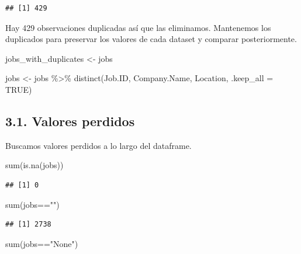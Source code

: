 \documentclass[
]{article}
\newenvironment{Shaded}{\begin{snugshade}}{\end{snugshade}}
\newcommand{\DataTypeTok}[1]{\textcolor[rgb]{0.87,0.87,0.75}{#1}}
\newcommand{\KeywordTok}[1]{\textcolor[rgb]{0.94,0.87,0.69}{#1}}
\newcommand{\NormalTok}[1]{\textcolor[rgb]{0.80,0.80,0.80}{#1}}
\newcommand{\OperatorTok}[1]{\textcolor[rgb]{0.94,0.94,0.82}{#1}}
\newcommand{\OtherTok}[1]{\textcolor[rgb]{0.94,0.94,0.56}{#1}}
\newcommand{\StringTok}[1]{\textcolor[rgb]{0.80,0.58,0.58}{#1}}
\begin{document}
\begin{verbatim}
## [1] 429
\end{verbatim}

Hay 429 observaciones duplicadas así que las eliminamos. Mantenemos los
duplicados para preservar los valores de cada dataset y comparar
posteriormente.

\begin{Shaded}
\begin{Highlighting}[]
\NormalTok{jobs\_with\_duplicates \textless{}{-}}\StringTok{ }\NormalTok{jobs}

\NormalTok{jobs \textless{}{-}}\StringTok{ }\NormalTok{jobs }\OperatorTok{\%\textgreater{}\%}\StringTok{ }
\StringTok{  }\KeywordTok{distinct}\NormalTok{(Job.ID, Company.Name, Location, }\DataTypeTok{.keep\_all =} \OtherTok{TRUE}\NormalTok{)}
\end{Highlighting}
\end{Shaded}

\hypertarget{valores-perdidos}{%
\subsection{3.1. Valores perdidos}\label{valores-perdidos}}

Buscamos valores perdidos a lo largo del dataframe.

\begin{Shaded}
\begin{Highlighting}[]
\KeywordTok{sum}\NormalTok{(}\KeywordTok{is.na}\NormalTok{(jobs))}
\end{Highlighting}
\end{Shaded}

\begin{verbatim}
## [1] 0
\end{verbatim}

\begin{Shaded}
\begin{Highlighting}[]
\KeywordTok{sum}\NormalTok{(jobs}\OperatorTok{==}\StringTok{""}\NormalTok{)}
\end{Highlighting}
\end{Shaded}

\begin{verbatim}
## [1] 2738
\end{verbatim}

\begin{Shaded}
\begin{Highlighting}[]
\KeywordTok{sum}\NormalTok{(jobs}\OperatorTok{==}\StringTok{"None"}\NormalTok{)}
\end{Highlighting}
\end{Shaded}
\end{document}
